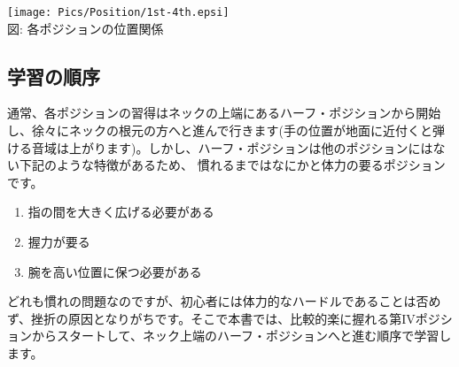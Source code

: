 \begin{flushleft}
\begin{minipage}{280pt}
\end{minipage}
\hfill
\begin{minipage}{140pt}
\begin{center}
\texttt{[image: Pics/Position/1st-4th.epsi]}\\
{\flushleft\small 図\thefigure : 各ポジションの位置関係\\}
\end{center}
\end{minipage}
\end{flushleft}

\subsection{学習の順序}
通常、各ポジションの習得はネックの上端にあるハーフ・ポジションから開始し、徐々にネックの根元の方へと進んで行きます(手の位置が地面に近付くと弾ける音域は上がります)。しかし、ハーフ・ポジションは他のポジションにはない下記のような特徴があるため、
慣れるまではなにかと体力の要るポジションです。

\begin{enumerate}
\item 指の間を大きく広げる必要がある
\item 握力が要る
\item 腕を高い位置に保つ必要がある
\end{enumerate}

どれも慣れの問題なのですが、初心者には体力的なハードルであることは否めず、挫折の原因となりがちです。そこで本書では、比較的楽に握れる第IVポジションからスタートして、ネック上端のハーフ・ポジションへと進む順序で学習します。



